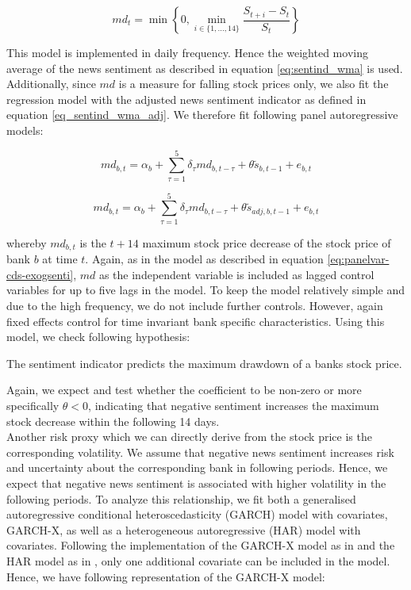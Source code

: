 \begin{equation}
	md_t = \min\left\{ 0, \min_{i\in\{1,...,14\}} \frac{S_{t+i}-S_t}{S_t} \right\}
\end{equation}


 This model is implemented in daily frequency. Hence the weighted moving average of the news sentiment as described in equation \ref{eq:sentind_wma} is used. Additionally, since $md$ is a measure for falling stock prices only, we also fit the regression model with the adjusted news sentiment indicator as defined in equation \ref{eq_sentind_wma_adj}. We therefore fit following panel autoregressive models:

\begin{equation} \label{eq:mdd}
	md_{b,t} = \alpha_b + \sum_{\tau=1}^5\delta_\tau md_{b,t-\tau} + \theta \tilde{s}_{b,t-1} + e_{b,t}
\end{equation}

\begin{equation} \label{eq:mdd}
	md_{b,t} = \alpha_b + \sum_{\tau=1}^5\delta_\tau md_{b,t-\tau} + \theta \tilde{s}_{adj,b,t-1} + e_{b,t}
\end{equation}

whereby $md_{b,t}$ is the $t+14$ maximum stock price decrease of the stock price of bank $b$ at time $t$. Again, as in the model as described in equation \ref{eq:panelvar-cds-exogsenti}, $md$ as the independent variable is included as lagged control variables for up to five lags in the model. To keep the model relatively simple and due to the high frequency, we do not include further controls. However, again fixed effects control for time invariant bank specific characteristics. Using this model, we check following hypothesis:

\begin{hyp}
	The sentiment indicator predicts the maximum drawdown of a banks stock price.
\end{hyp}

Again, we expect and test whether the coefficient to be non-zero or more specifically $\theta<0$, indicating that negative sentiment increases the maximum stock decrease within the following 14 days. \\

Another risk proxy which we can directly derive from the stock price is the corresponding volatility. We assume that negative news sentiment increases risk and uncertainty about the corresponding bank in following periods. Hence, we expect that negative news sentiment is associated with higher volatility in the following periods. To analyze this relationship, we fit both a generalised autoregressive conditional heteroscedasticity (GARCH) model with covariates, GARCH-X, as well as a heterogeneous autoregressive (HAR) model with covariates. Following the implementation of the GARCH-X model as in \cite{sucarrat2021} and the HAR model as in \cite{boudt2022}, only one additional covariate can be included in the model. Hence, we have following representation of the GARCH-X model: 

